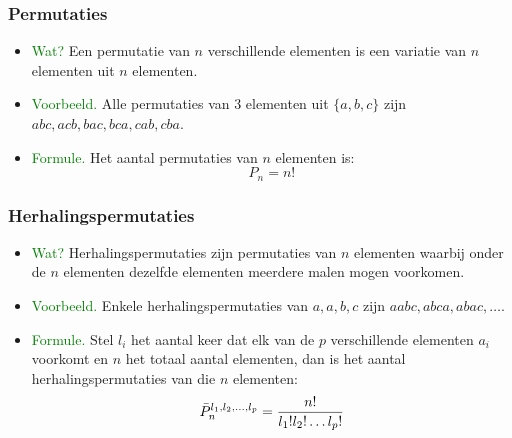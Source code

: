 \hypertarget{permutaties}{}
\subsubsection{Permutaties} \label{permutaties}
\begin{itemize}
\item \textcolor{green}{Wat?} \newline
Een permutatie van $n$ verschillende elementen is een variatie van $n$ elementen uit $n$ elementen.
\item \textcolor{green}{Voorbeeld.} \newline
Alle permutaties van 3 elementen uit $\{a, b, c\}$ zijn $abc, acb, bac, bca, cab, cba$.
\item \textcolor{green}{Formule.} \newline
Het aantal permutaties van $n$ elementen is:
\[P_n=n!\]
\end{itemize}

\hypertarget{herhalingspermutaties}{}
\subsubsection{Herhalingspermutaties} \label{herhalingspermutaties}
\begin{itemize}
\item \textcolor{green}{Wat?} \newline
Herhalingspermutaties zijn permutaties van $n$ elementen waarbij onder de $n$ elementen dezelfde elementen meerdere malen mogen voorkomen.
\item \textcolor{green}{Voorbeeld.} \newline
Enkele herhalingspermutaties van ${a, a, b, c}$ zijn $aabc, abca, abac,\ldots$.
\item \textcolor{green}{Formule.} \newline
Stel $l_i$ het aantal keer dat elk van de $p$ verschillende elementen $a_i$ voorkomt en $n$ het totaal aantal elementen, dan is het aantal herhalingspermutaties van die $n$ elementen:
\[\bar{P}^{l_1,l_2,\ldots,l_p}_n=\displaystyle\frac{\displaystyle n!}{\displaystyle l_1!l_2!\ldots l_p!}\]
\end{itemize}

\hypertarget{combinaties}{}
